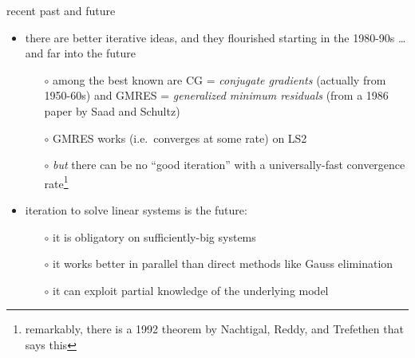\documentclass[10pt,hyperref]{beamer}
\begin{document}
\begin{frame}{recent past and future}

\begin{itemize}
\item there are better iterative ideas, and they flourished starting in the 1980-90s \dots and far into the future
  \begin{itemize}
  \item[$\circ$] among the best known are CG = \emph{conjugate gradients} (actually from 1950-60s) and GMRES = \emph{generalized minimum residuals} (from a 1986 paper by Saad and Schultz)
  \item[$\circ$] GMRES works (i.e.~converges at some rate) on LS2
  \item[$\circ$] \emph{but} there can be no ``good iteration'' with a universally-fast convergence rate\footnote{remarkably, there is a 1992 theorem by Nachtigal, Reddy, and Trefethen that says this}
\end{itemize}

\medskip 
\item iteration to solve linear systems is the future:
  \begin{itemize}
  \item[$\circ$] it is obligatory on sufficiently-big systems
  \item[$\circ$] it works better in parallel than direct methods like Gauss elimination
  \item[$\circ$] it can exploit partial knowledge of the underlying model
  \end{itemize}
\end{itemize}
\end{frame}
\end{document}
